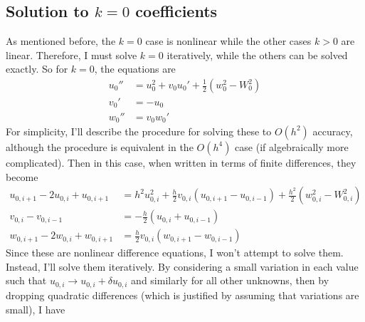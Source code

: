 \documentclass[10pt,a4paper]{report}
\begin{document}
\subsection{Solution to $k = 0$ coefficients}

As mentioned before, the $k = 0$ case is nonlinear while the other cases $k > 0$ are linear. Therefore, I must solve $k = 0$ iteratively, while the others can be solved exactly. So for $k = 0$, the equations are
\begin{align*}
u_0'' & = u_0^2 + v_0 u_0' + \frac{1}{2} \left( w_0^2 - W_0^2 \right) \\
v_0' & = -u_0 \\
w_0'' & = v_0 w_0'
\end{align*}
For simplicity, I'll describe the procedure for solving these to $O(h^2)$ accuracy, although the procedure is equivalent in the $O(h^4)$ case (if algebraically more complicated). Then in this case, when written in terms of finite differences, they become
\begin{align*}
u_{0,i+1} - 2 u_{0,i} + u_{0,i+1} & = h^2 u_{0,i}^2 + \frac{h}{2} v_{0,i} \left(u_{0,i+1} - u_{0,i-1} \right) + \frac{h^2}{2} \left( w_{0,i}^2 - W_{0,i}^2 \right) \\
v_{0,i} - v_{0,i-1} & = -\frac{h}{2} \left(u_{0,i} + u_{0,i-1} \right) \\
w_{0,i+1} - 2 w_{0,i} + w_{0,i+1} & = \frac{h}{2} v_{0,i} \left(w_{0,i+1} - w_{0,i-1} \right)
\end{align*}
Since these are nonlinear difference equations, I won't attempt to solve them. Instead, I'll solve them iteratively. By considering a small variation in each value such that $u_{0,i} \rightarrow u_{0,i} + \delta u_{0,i}$ and similarly for all other unknowns, then by dropping quadratic differences (which is justified by assuming that variations are small), I have
\end{document}
